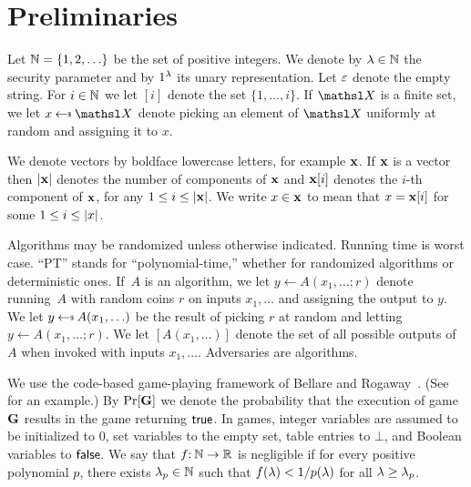 \section{Preliminaries}\label{sec-defs}

Let ${{\mathbb N}} =\{1,2,\ldots\}$ be the set of positive integers.
We denote by $\lambda\in{{\mathbb N}}$ the security parameter and by $1^\lambda$ its unary representation. 
Let $\varepsilon$ denote the empty string.
For $i\in{{\mathbb N}}$ we let $[i]$ denote the set $\{1, \ldots, i\}$. 
If $\setX$ is a finite set, we let $x \getsr \setX$ denote picking an element of $\setX$ uniformly at random and assigning it to $x$.

We denote vectors by boldface lowercase letters, for example ${\bf x}$.
If ${\bf x}$ is a vector then $|{\bf x}|$ denotes the number of components of ${\bf x}$ and ${\bf x}[i]$ denotes the $i$-th component of ${\bf x}$, for any $1 \leq i \leq |{\bf x}|$.
We write $x\in{\bf x}$ to mean that $x={\bf x}[i]$ for some $1\leq i \leq |x|$.

Algorithms may be randomized unless otherwise indicated.
Running time is worst case.
``PT'' stands for ``polynomial-time,'' whether for randomized algorithms or deterministic ones. 
If~$A$ is an algorithm, we let $y \gets A(x_1,\ldots;r)$ denote running~$A$ with random coins $r$ on inputs $x_1,\ldots$ and assigning the output to $y$.
We let $y \getsr A(x_1,\ldots)$ be the result of picking $r$ at random and letting $y \gets A(x_1,\ldots;r)$.
We let $[A(x_1,\ldots)]$ denote the set of all possible outputs of $A$ when invoked with inputs $x_1,\ldots$.
Adversaries are algorithms.

We use the code-based game-playing framework of Bellare and Rogaway~\cite{EC:BelRog06}.
(See  for an example.)
By $\Pr[\mathbf{G}]$ we denote the probability that the execution of game $\mathbf{G}$ results in the game returning $\mathsf{true}$.
In games, integer variables are assumed to be initialized to $0$, set variables to the empty set, table entries to $\bot$, and Boolean variables to $\mathsf{false}$. %
We say that $f{:\:}{{\mathbb N}}\to{{\mathbb R}}$ is negligible if for every positive polynomial $p$, there exists $\lambda_p\in{{\mathbb N}}$ such that $f(\lambda) < 1/p(\lambda)$ for all $\lambda \geq \lambda_p$.